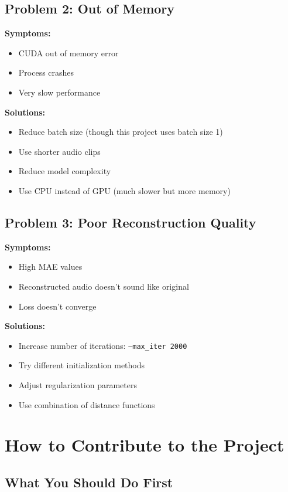 \documentclass[12pt]{article}
\begin{document}
\subsection{Problem 2: Out of Memory}

\textbf{Symptoms:}
\begin{itemize}
    \item CUDA out of memory error
    \item Process crashes
    \item Very slow performance
\end{itemize}

\textbf{Solutions:}
\begin{itemize}
    \item Reduce batch size (though this project uses batch size 1)
    \item Use shorter audio clips
    \item Reduce model complexity
    \item Use CPU instead of GPU (much slower but more memory)
\end{itemize}

\subsection{Problem 3: Poor Reconstruction Quality}

\textbf{Symptoms:}
\begin{itemize}
    \item High MAE values
    \item Reconstructed audio doesn't sound like original
    \item Loss doesn't converge
\end{itemize}

\textbf{Solutions:}
\begin{itemize}
    \item Increase number of iterations: \texttt{--max\_iter 2000}
    \item Try different initialization methods
    \item Adjust regularization parameters
    \item Use combination of distance functions
\end{itemize}

\section{How to Contribute to the Project}

\subsection{What You Should Do First}
\end{document}
